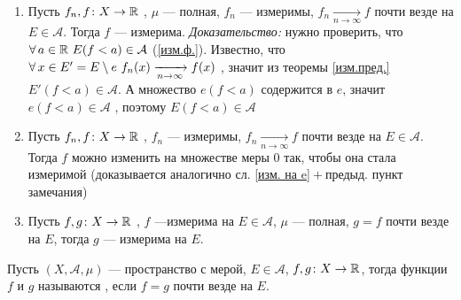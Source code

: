 \begin{zam}[https://www.youtube.com/live/3LvgYceATKY?si=4BDap_maNQ8Eydlh&t=10412]
	\begin{enumerate}
		\item Пусть $f_n, f \colon X \to \mathbb R$ , $\mu$ --- полная, $f_n$ --- измеримы, $f_n \xrightarrow[n \to \infty]{} f$ почти везде на $E \in \mathcal{A}$. Тогда $f$ --- измерима. \textit{Доказательство:} нужно проверить, что $\forall \, a \in \mathbb R\ E(f < a) \in \mathcal A$ (\ref{изм.ф.}). Известно, что $\forall \, x \in E' = E \setminus e\ f_n(x) \xrightarrow[n \to \infty]{} f(x)$ , значит из теоремы \ref{изм.пред.} $E'(f < a) \in \mathcal A$. А множество $e(f < a)$ содержится в $e$, значит $e(f < a) \in \mathcal{A}$ , поэтому $E(f < a) \in \mathcal A$   
	
	
	\item  Пусть $f_n, f \colon X \to \mathbb R$ , $f_n$ --- измеримы, $f_n \xrightarrow[n \to \infty]{} f$ почти везде на $E \in \mathcal{A}$. Тогда $f$ можно изменить на множестве меры 0 так, чтобы она стала измеримой (доказывается аналогично сл. \ref{изм. на e}${}+{}$предыд. пункт замечания)
	
	\item Пусть $f, g \colon X \to \mathbb R$ , $f$ ---измерима на $E \in \mathcal A$, $\mu$ --- полная, $g = f$ почти везде на $E$, тогда $g$ --- измерима на $E$. 
\end{enumerate}
\end{zam}

\begin{opr}
	Пусть $(X, \mathcal A, \mu)$ --- пространство с мерой, $E \in \mathcal A$, $f, g \colon X \to \mathbb R$, тогда функции $f$ и $g$ называются , если $f = g$ почти везде на $E$.
\end{opr}

